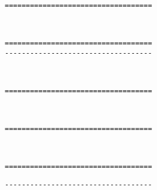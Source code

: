 \

\goodbreak \begin{samepage} \small \begin{verbatim}
===================================
\end{verbatim} \normalsize \end{samepage}

\

\goodbreak \begin{samepage} \small \begin{verbatim}
===================================
-----------------------------------
\end{verbatim} \normalsize \end{samepage}

\

\goodbreak \begin{samepage} \small \begin{verbatim}
===================================
\end{verbatim} \normalsize \end{samepage}

\

\goodbreak \begin{samepage} \small \begin{verbatim}
===================================
\end{verbatim} \normalsize \end{samepage}

\

\goodbreak \begin{samepage} \small \begin{verbatim}
===================================
\end{verbatim} \end{samepage} \goodbreak \begin{samepage} \begin{verbatim}
-----------------------------------
\end{verbatim} \normalsize \end{samepage}

\







\goodbreak
 {}

